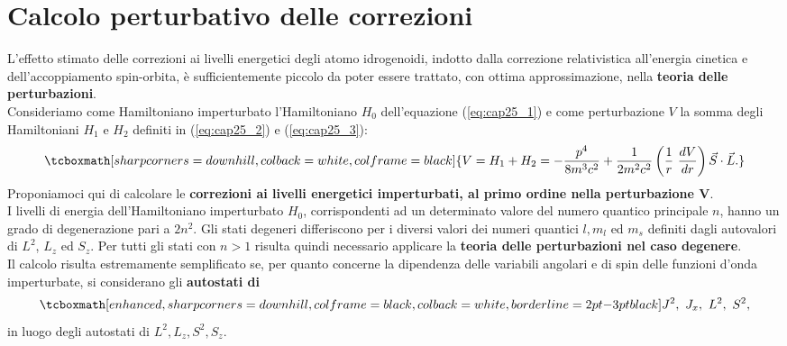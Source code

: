 \section{Calcolo perturbativo delle correzioni}
L'effetto stimato delle correzioni ai livelli energetici degli atomo idrogenoidi, indotto dalla correzione relativistica all'energia cinetica e dell'accoppiamento spin-orbita, è sufficientemente piccolo da poter essere trattato, con ottima approssimazione, nella \textbf{teoria delle perturbazioni}. \\

Consideriamo come Hamiltoniano imperturbato l'Hamiltoniano $H_0$ dell'equazione (\ref{eq:cap25_1}) e come perturbazione $V$ la somma degli Hamiltoniani $H_1$ e $H_2$ definiti in (\ref{eq:cap25_2}) e (\ref{eq:cap25_3}):
	\begin{equation} 
		\tcboxmath[sharp corners=downhill, colback=white, colframe=black]{
			V=H_1+H_2=-\frac{p^4}{8m^3c^2}+\frac{1}{2m^2c^2} \left( \frac{1}{r} \ \frac{dV}{dr} \right) \vec{S} \cdot \vec{L} .
			}
	\end{equation}
Proponiamoci qui di calcolare le \textbf{correzioni ai livelli energetici imperturbati, al primo ordine nella perturbazione $\boldsymbol{V}$}. \\

I livelli di energia dell'Hamiltoniano imperturbato $H_0$, corrispondenti ad un determinato valore del numero quantico principale $n$, hanno un grado di degenerazione pari a $2n^2$. Gli stati degeneri differiscono per i diversi valori dei numeri quantici $l,m_l$ ed $m_s$ definiti dagli autovalori di $L^2$, $L_z$ ed $S_z$. Per tutti gli stati con $n>1$ risulta quindi necessario applicare la \textbf{teoria delle perturbazioni nel caso degenere}. \\

Il calcolo risulta estremamente semplificato se, per quanto concerne la dipendenza delle variabili angolari e di spin delle funzioni d'onda imperturbate, si considerano gli \textbf{autostati di}
	\begin{equation}
	\label{eq:cap25_4}
		\tcboxmath[enhanced, sharp corners=downhill, colframe=black, colback=white, borderline={2pt}{-3pt}{black}]{
			J^2, \ J_x, \ L^2, \ S^2 ,
			}
	\end{equation}
in luogo degli autostati di $L^2, L_z, S^2, S_z$. \\

